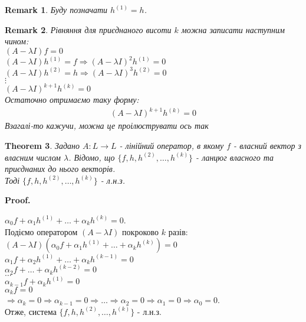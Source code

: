 \documentclass[a4paper, 10pt]{article}
\makeatletter
\theoremstyle{theoremdd}
\newtheorem{theorem}{Theorem}[subsection]
\newtheorem{remark}[theorem]{Remark}
\renewenvironment{proof}[1][Proof.\\]{\par
\pushQED{\hfill \qed}%
\normalfont \topsep6\p@\@plus6\p@\relax
\trivlist
\item\relax
{\bfseries
#1\@addpunct{.}}\hspace\labelsep\ignorespaces
}{%
\popQED\endtrivlist\@endpefalse
}
\makeatother
\begin{document}
\begin{remark}
Буду позначати $h^{(1)} = h$.
\end{remark}

\begin{remark}
Рівняння для приєднаного висоти $k$ можна записати наступним чином:\\
$(A-\lambda I)f = 0$\\
$(A-\lambda I)h^{(1)} = f \Rightarrow (A-\lambda I)^2 h^{(1)} = 0$\\
$(A-\lambda I)h^{(2)} = h \Rightarrow (A-\lambda I)^3 h^{(2)} = 0$\\
$\vdots$\\
$(A-\lambda I)^{k+1}h^{(k)} = 0$\\
Остаточно отримаємо таку форму:
\begin{align*}
(A-\lambda I)^{k+1}h^{(k)} = 0
\end{align*}
Взагалі-то кажучи, можна це проілюструвати ось так
\begin{figure}[H]
\centering
{}
\end{figure}
\end{remark}

\begin{theorem}
Задано $A: L \to L$ - лінійний оператор, в якому $f$ - власний вектор з власним числом $\lambda$. Відомо, що $\{f,h,h^{(2)},\dots,h^{(k)}\}$ - ланцюг власного та приєднаних до нього векторів.\\
Тоді $\{f,h,h^{(2)},\dots,h^{(k)}\}$ - л.н.з.
\end{theorem}

\begin{proof}
$\alpha_0 f + \alpha_1 h^{(1)} + \dots + \alpha_k h^{(k)} = 0$.\\
Подіємо оператором $(A-\lambda I)$ покроково $k$ разів:\\
$(A-\lambda I)(\alpha_0 f + \alpha_1 h^{(1)} + \dots + \alpha_k h^{(k)}) = 0$\\
$\alpha_1 f + \alpha_2 h^{(1)} + \dots + \alpha_k h^{(k-1)} = 0$\\
$\alpha_2 f + \dots + \alpha_k h^{(k-2)} = 0$\\
$\dots$\\
$\alpha_{k-1} f + \alpha_k h^{(1)} = 0$\\
$\alpha_k f = 0$\\
$\Rightarrow \alpha_k = 0 \Rightarrow \alpha_{k-1} = 0 \Rightarrow \dots \Rightarrow \alpha_2 = 0 \Rightarrow \alpha_1 = 0 \Rightarrow \alpha_0 = 0$.\\
Отже, система $\{f,h,h^{(2)},\dots,h^{(k)}\}$ - л.н.з.
\end{proof}
\end{document}
